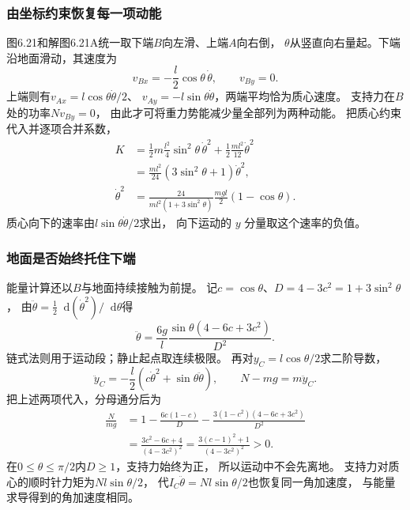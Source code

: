 \documentclass[UTF8,fontset=fandol,a4paper,11pt]{ctexart}
\newcommand{\dd}{\mathop{}\!\mathrm{d}}
\begin{document}
\subsubsection*{由坐标约束恢复每一项动能}
图6.21和解图6.21A统一取下端$B$向左滑、上端$A$向右倒，
$\theta$从竖直向右量起。下端沿地面滑动，其速度为
\[
v_{Bx}=-\frac l2\cos\theta\,\dot\theta,\qquad v_{By}=0.
\]
上端则有$v_{Ax}=l\cos\theta\dot\theta/2$、
$v_{Ay}=-l\sin\theta\dot\theta$，两端平均恰为质心速度。
支持力在$B$处的功率$N v_{By}=0$，
由此才可将重力势能减少量全部列为两种动能。
把质心约束代入并逐项合并系数，
\[
\begin{aligned}
K&=\frac12m\frac{l^2}{4}\sin^2\theta\,\dot\theta^2
 +\frac12\frac{ml^2}{12}\dot\theta^2\\
 &=\frac{ml^2}{24}(3\sin^2\theta+1)\dot\theta^2,\\
\dot\theta^2&=\frac{24}{ml^2(1+3\sin^2\theta)}
 \frac{mgl}{2}(1-\cos\theta).
\end{aligned}
\]
质心向下的速率由$l\sin\theta\dot\theta/2$求出，
向下运动的 $y$ 分量取这个速率的负值。

\subsubsection*{地面是否始终托住下端}
能量计算还以$B$与地面持续接触为前提。
记$c=\cos\theta$、$D=4-3c^2=1+3\sin^2\theta$，
由$\ddot\theta=\tfrac12\dd(\dot\theta^2)/\dd\theta$得
\[
\ddot\theta=\frac{6g}{l}
\frac{\sin\theta(4-6c+3c^2)}{D^2}.
\]
链式法则用于运动段；静止起点取连续极限。
再对$y_C=l\cos\theta/2$求二阶导数，
\[
\ddot y_C=-\frac l2\left(c\dot\theta^2+
\sin\theta\ddot\theta\right),\qquad N-mg=m\ddot y_C.
\]
把上述两项代入，分母通分后为
\[
\begin{aligned}
\frac{N}{mg}
&=1-\frac{6c(1-c)}{D}
 -\frac{3(1-c^2)(4-6c+3c^2)}{D^2}\\
&=\frac{3c^2-6c+4}{(4-3c^2)^2}
 =\frac{3(c-1)^2+1}{(4-3c^2)^2}>0.
\end{aligned}
\]
在$0\leq\theta\leq\pi/2$内$D\geq1$，支持力始终为正，
所以运动中不会先离地。
支持力对质心的顺时针力矩为$Nl\sin\theta/2$，
代$I_C\ddot\theta=Nl\sin\theta/2$也恢复同一角加速度，
与能量求导得到的角加速度相同。
\end{document}
